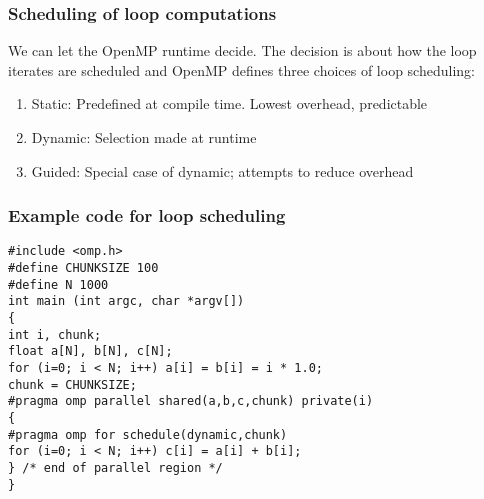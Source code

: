 \documentclass{beamer}
\begin{document}
\begin{frame}
\frametitle{Scheduling of  loop computations}

\begin{block}{}
We can let  the OpenMP runtime decide. The decision is about how the loop iterates are scheduled
and  OpenMP defines three choices of loop scheduling:
\begin{enumerate}
\item Static: Predefined at compile time. Lowest overhead, predictable

\item Dynamic: Selection made at runtime 

\item Guided: Special case of dynamic; attempts to reduce overhead
\end{enumerate}

\noindent
\end{block}
\end{frame}

\begin{frame}
\frametitle{Example code for loop scheduling}

\begin{block}{}
















\begin{verbatim}
#include <omp.h>
#define CHUNKSIZE 100
#define N 1000
int main (int argc, char *argv[])
{
int i, chunk;
float a[N], b[N], c[N];
for (i=0; i < N; i++) a[i] = b[i] = i * 1.0;
chunk = CHUNKSIZE;
#pragma omp parallel shared(a,b,c,chunk) private(i)
{
#pragma omp for schedule(dynamic,chunk)
for (i=0; i < N; i++) c[i] = a[i] + b[i];
} /* end of parallel region */
}

\end{verbatim}


\end{block}
\end{frame}
\end{document}
